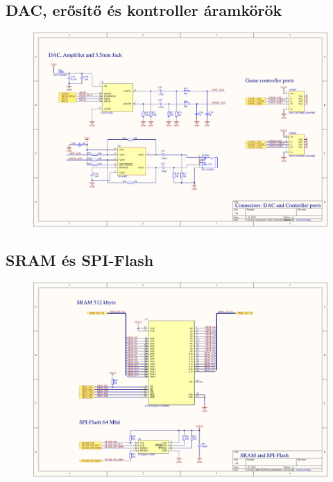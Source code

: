 \subsection{DAC, erősítő és kontroller áramkörök}
\label{sec:DAC-controllers}
\begin{figure}[H]
	\centering
	\includegraphics[width=220mm, keepaspectratio, angle=90]{figures/DAC-CONTROLLER}
\end{figure}
\subsection{SRAM és SPI-Flash}
\label{sec:SRAM-SPI-Flash}
\begin{figure}[H]
	\centering
	\includegraphics[width=220mm, keepaspectratio, angle=90]{figures/SRAM-FLASH}
\end{figure}
